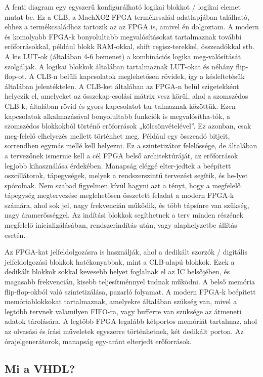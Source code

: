 \documentclass[a4paper,12pt,oneside]{book}
\begin{document}
A fenti diagram egy egyszerű konfigurálható logikai blokkot / logikai elemet mutat be. Ez a CLB, a MachXO2 FPGA termékcsalád adatlapjában található, ehhez a termékcsaládhoz tartozik az az FPGA is, amivel én dolgoztam. A modern és komolyabb FPGA-k bonyolultabb megvalósításokat tartalmaznak további erőforrásokkal, például blokk RAM-okkal, shift regisz-terekkel, összeadókkal stb. A kis LUT-ok (általában 4-6 bemenet) a kombinációs logika meg-valósítását szolgáljak. A logikai blokkok általában tartalmaznak LUT-okat és néhány flip-flop-ot. A CLB-n belüli kapcsolatok meglehetősen rövidek, így a késleltetésük általában jelentéktelen. A CLB-ket általában az FPGA-n belül szigetekként helyezik el, amelyeket az összekap-csolási mátrix vesz körül, ahol a szomszédos CLB-k, általában rövid és gyors kapcsolatot tar-talmaznak közöttük. Ezen kapcsolatok alkalmazásával bonyolultabb funkciók is megvalósítha-tók, a szomszédos blokkokból történő erőforrások „kölcsönvételével”. Ez azonban, csak meg-felelő elhelyezés mellett történhet meg. Például egy összeadó bitjeit, sorrendben egymás mellé kell helyezni. Ez a szintetizátor felelőssége, de általában a tervezőnek ismernie kell a cél FPGA belső architektúráját, az erőforrások legjobb kihasználása érdekében. Manapság eléggé elter-jedtek a beépített oszcillátorok, tápegységek, melyek a rendszerszintű tervezést segítik, és he-lyet spórolnak. Nem szabad figyelmen kívül hagyni azt a tényt, hogy a megfelelő tápegység megtervezése meglehetősen összetett feladat a modern FPGA-k számára, ahol sok jel, nagy frekvencián működik, és több tápsínre van szükség, nagy áramerősséggel. Az indítási blokkok segíthetnek a terv minden részének megfelelő inicializálásában, rendszerindítás után, vagy alaphelyzetbe állítás esetén. 

Az FPGA-kat jelfeldolgozásra is használják, ahol a dedikált szorzók / digitális jelfeldolgozási blokkok hatékonyabbak, mint a CLB-alapú blokkok. Ezek a dedikált blokkok sokkal kevesebb helyet foglalnak el az IC belsőjében, és magasabb frekvencián, kisebb teljesítménnyel tudnak működni. A belső memória flip-flop-okból való szintetizálása, pazarló folyamat. A modern FPGA-k beépített memóriablokkokat tartalmaznak, amelyekre általában szükség van, mivel a legtöbb tervnek valamilyen FIFO-ra, vagy bufferre van szüksége az átmeneti adatok tárolására. A legtöbb FPGA legalább kétportos memóriát tartalmaz, ahol az olvasási és írási műveletek egyszerre történhetnek, két dedikált porton. Az órajelgenerátorok, manapság egy-aránt elterjedt erőforrások.

\subsection{Mi a VHDL?}
\end{document}
